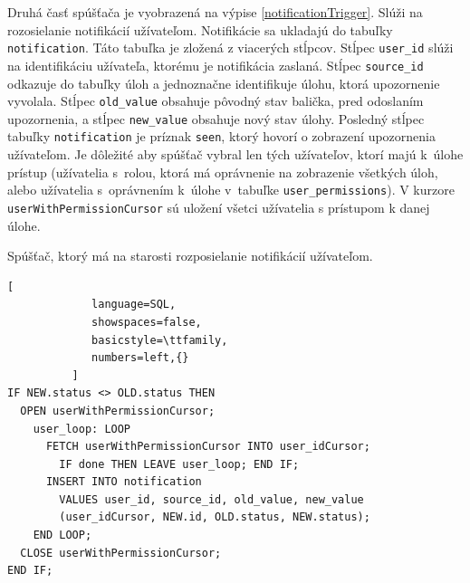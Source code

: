 \documentclass[slovak]{fitthesis}
\begin{document}
Druhá časť spúšťača je vyobrazená na výpise \ref{notificationTrigger}. Slúži na rozosielanie notifikácií užívateľom. Notifikácie sa ukladajú do tabuľky \texttt{notification}. Táto tabuľka je zložená z viacerých stĺpcov. Stĺpec \texttt{user\_id} slúži na identifikáciu užívateľa, ktorému je notifikácia zaslaná. Stĺpec \texttt{source\_id} odkazuje do tabuľky úloh a jednoznačne identifikuje úlohu, ktorá upozornenie vyvolala. Stĺpec \texttt{old\_value} obsahuje pôvodný stav balička, pred odoslaním upozornenia, a stĺpec \texttt{new\_value} obsahuje nový stav úlohy. Posledný stĺpec tabuľky \texttt{notification} je príznak \texttt{seen}, ktorý hovorí o zobrazení upozornenia užívateľom. Je dôležité aby spúšťač vybral len tých užívateľov, ktorí majú k~úlohe prístup (užívatelia s~rolou, ktorá má oprávnenie na zobrazenie všetkých úloh, alebo užívatelia s~oprávnením k~úlohe v~tabuľke \texttt{user\_permissions}). V kurzore \texttt{userWithPermissionCursor} sú uložení všetci užívatelia s prístupom k danej úlohe.
\begin{algorithm}[H]
  \caption{Spúšťač, ktorý má na starosti rozposielanie notifikácií užívateľom.}
  \label{notificationTrigger}
  \begin{lstlisting}[
             language=SQL,
             showspaces=false,
             basicstyle=\ttfamily,
             numbers=left,{}
          ]
IF NEW.status <> OLD.status THEN 
  OPEN userWithPermissionCursor; 
    user_loop: LOOP
      FETCH userWithPermissionCursor INTO user_idCursor;
        IF done THEN LEAVE user_loop; END IF;
      INSERT INTO notification 
        VALUES user_id, source_id, old_value, new_value
        (user_idCursor, NEW.id, OLD.status, NEW.status);
    END LOOP;
  CLOSE userWithPermissionCursor;
END IF;
  \end{lstlisting}
\end{algorithm}
\end{document}
